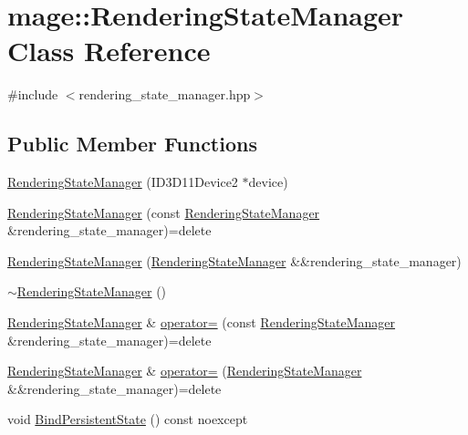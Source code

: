 \hypertarget{classmage_1_1_rendering_state_manager}{}\section{mage\+:\+:Rendering\+State\+Manager Class Reference}
\label{classmage_1_1_rendering_state_manager}


{\ttfamily \#include $<$rendering\+\_\+state\+\_\+manager.\+hpp$>$}

\subsection*{Public Member Functions}
\begin{DoxyCompactItemize}
\item 
\hyperlink{classmage_1_1_rendering_state_manager_a88b39630c86f0291307e62e14ba9f7fd}{Rendering\+State\+Manager} (I\+D3\+D11\+Device2 $\ast$device)
\item 
\hyperlink{classmage_1_1_rendering_state_manager_af73792aa9689050ee050b641ffbefe39}{Rendering\+State\+Manager} (const \hyperlink{classmage_1_1_rendering_state_manager}{Rendering\+State\+Manager} \&rendering\+\_\+state\+\_\+manager)=delete
\item 
\hyperlink{classmage_1_1_rendering_state_manager_a7103afcf92884f7916b7039946c1a605}{Rendering\+State\+Manager} (\hyperlink{classmage_1_1_rendering_state_manager}{Rendering\+State\+Manager} \&\&rendering\+\_\+state\+\_\+manager)
\item 
\hyperlink{classmage_1_1_rendering_state_manager_ad4865219aaaac55dd53c4ab51af8d63f}{$\sim$\+Rendering\+State\+Manager} ()
\item 
\hyperlink{classmage_1_1_rendering_state_manager}{Rendering\+State\+Manager} \& \hyperlink{classmage_1_1_rendering_state_manager_a4f2ee3e88ad79660e867a4a945ebe951}{operator=} (const \hyperlink{classmage_1_1_rendering_state_manager}{Rendering\+State\+Manager} \&rendering\+\_\+state\+\_\+manager)=delete
\item 
\hyperlink{classmage_1_1_rendering_state_manager}{Rendering\+State\+Manager} \& \hyperlink{classmage_1_1_rendering_state_manager_ac8ab6290fb1801ed1acc5b50c8749b6b}{operator=} (\hyperlink{classmage_1_1_rendering_state_manager}{Rendering\+State\+Manager} \&\&rendering\+\_\+state\+\_\+manager)=delete
\item 
void \hyperlink{classmage_1_1_rendering_state_manager_aadbe543fdb458104c42fe9182848805e}{Bind\+Persistent\+State} () const noexcept

\end{DoxyCompactItemize}
